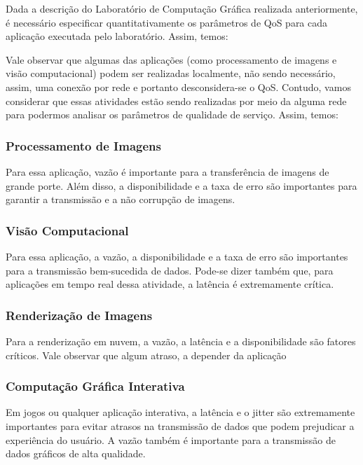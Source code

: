Dada a descrição do Laboratório de Computação Gráfica realizada anteriormente, é necessário especificar quantitativamente os parâmetros de QoS para cada aplicação executada pelo laboratório. Assim, temos:

Vale observar que algumas das aplicações (como processamento de imagens e visão computacional) podem ser realizadas localmente, não sendo necessário, assim, uma conexão por rede e portanto desconsidera-se o QoS. Contudo, vamos considerar que essas atividades estão sendo realizadas por meio da alguma rede para podermos analisar os parâmetros de qualidade de serviço. Assim, temos:

\subsubsection{Processamento de Imagens}

Para essa aplicação, vazão é importante para a transferência de imagens de grande porte. Além disso, a disponibilidade e a taxa de erro são importantes para garantir a transmissão e a não corrupção de imagens.

\subsubsection{Visão Computacional}

Para essa aplicação, a vazão, a disponibilidade e a taxa de erro são importantes para a transmissão bem-sucedida de dados. Pode-se dizer também que, para aplicações em tempo real dessa atividade, a latência é extremamente crítica.

\subsubsection{Renderização de Imagens}

Para a renderização em nuvem, a vazão, a latência e a disponibilidade são fatores críticos. Vale observar que algum atraso, a depender da aplicação

\subsubsection{Computação Gráfica Interativa}

Em jogos ou qualquer aplicação interativa, a latência e o jitter são extremamente importantes para evitar atrasos na transmissão de dados que podem prejudicar a experiência do usuário. A vazão também é importante para a transmissão de dados gráficos de alta qualidade.

